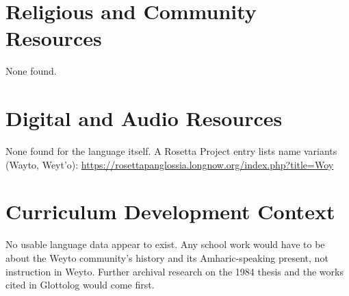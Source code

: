 \documentclass[12pt]{article}
\begin{document}
\section{Religious and Community Resources}
None found.

\section{Digital and Audio Resources}
None found for the language itself. A Rosetta Project entry lists name variants (Wayto, Weyt'o): \url{https://rosettapanglossia.longnow.org/index.php?title=Woy}

\section{Curriculum Development Context}
No usable language data appear to exist. Any school work would have to be about the Weyto community's history and its Amharic-speaking present, not instruction in Weyto. Further archival research on the 1984 thesis and the works cited in Glottolog would come first.
\end{document}
